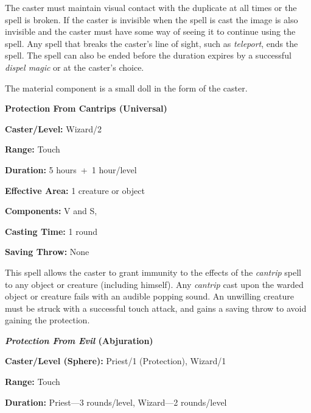 \begin{multicols}{2}
The caster must maintain visual contact with the duplicate at all times or the spell is broken.  If the caster is invisible when the spell is cast the image is also invisible and the caster must have some way of seeing it to continue using the spell.  Any spell that breaks the caster's line of sight, such as \textit{teleport}, ends the spell.  The spell can also be ended before the duration expires by a successful \textit{dispel magic} or at the caster's choice.

The material component is a small doll in the form of the caster.

\vspace{1em}

\noindent
\begin{minipage}{\columnwidth}

\noindent \textbf{Protection From Cantrips (Universal)}

\noindent \textbf{Caster/Level:} Wizard/2

\noindent \textbf{Range:} Touch

\noindent \textbf{Duration:} 5 hours~+~1 hour/level

\noindent \textbf{Effective Area:} 1 creature or object

\noindent \textbf{Components:} V and S,

\noindent \textbf{Casting Time:} 1 round

\noindent \textbf{Saving Throw:} None

\end{minipage}

This spell allows the caster to grant immunity to the effects of the \textit{cantrip} spell to any object or creature (including himself).  Any \textit{cantrip} cast upon the warded object or creature fails with an audible popping sound.  An unwilling creature must be struck with a successful touch attack, and gains a saving throw to avoid gaining the protection.

\vspace{1em}

\noindent
\begin{minipage}{\columnwidth}

\noindent \textbf{\textit{Protection From Evil} (Abjuration)}

\noindent \textbf{Caster/Level (Sphere):} Priest/1 (Protection), Wizard/1

\noindent \textbf{Range:} Touch

\noindent \textbf{Duration:} Priest---3 rounds/level, Wizard---2 rounds/level


\end{minipage}
\end{multicols}
